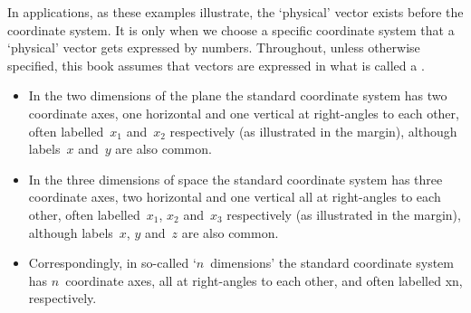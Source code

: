 In applications, as these examples illustrate, the `physical' vector exists before the coordinate system.
It is only when we choose a specific coordinate system that a `physical' vector gets expressed by numbers.
Throughout, unless otherwise specified, this book assumes that vectors are expressed in what is called a .
\begin{itemize}
\item In the two dimensions of the plane the standard coordinate system has two coordinate axes, 
%
one horizontal and one vertical at right-angles to each other, often labelled~\(x_1\) and~\(x_2\) respectively (as illustrated in the margin), although labels~\(x\) and~\(y\) are also common.%

\item In the three dimensions of space the standard coordinate system has three coordinate axes, 
%
two horizontal and one vertical all at right-angles to each other, often labelled~\(x_1\), \(x_2\) and~\(x_3\) respectively (as illustrated in the margin), although labels~\(x\), \(y\) and~\(z\) are also common.

\item Correspondingly, in so-called `\(n\)~dimensions' the standard coordinate system has \(n\)~coordinate axes, all at right-angles to each other, and often labelled \hlist xn, respectively.
\end{itemize}




